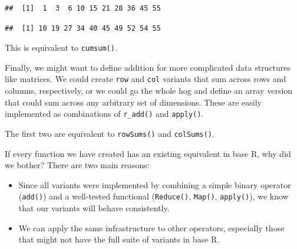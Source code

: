 \begin{verbatim}
##  [1]  1  3  6 10 15 21 28 36 45 55
\end{verbatim}

\begin{Shaded}
\begin{Highlighting}[]
\NormalTok{(}\OperatorTok{:}\NormalTok{)}
\end{Highlighting}
\end{Shaded}

\begin{verbatim}
##  [1] 10 19 27 34 40 45 49 52 54 55
\end{verbatim}

This is equivalent to \texttt{cumsum()}.

Finally, we might want to define addition for more complicated data
structures like matrices. We could create \texttt{row} and \texttt{col}
variants that sum across rows and columns, respectively, or we could go
the whole hog and define an array version that could sum across any
arbitrary set of dimensions. These are easily implemented as
combinations of \texttt{r\_add()} and \texttt{apply()}.

\begin{Shaded}
\begin{Highlighting}[]
\StringTok{ } \NormalTok{) \{}
\NormalTok{\}}
\StringTok{ } \NormalTok{) \{}
\NormalTok{\}}
\StringTok{ } \NormalTok{) \{}
\NormalTok{\}}
\end{Highlighting}
\end{Shaded}

The first two are equivalent to \texttt{rowSums()} and
\texttt{colSums()}.

If every function we have created has an existing equivalent in base R,
why did we bother? There are two main reasons:

\begin{itemize}
\item
  Since all variants were implemented by combining a simple binary
  operator (\texttt{add()}) and a well-tested functional
  (\texttt{Reduce()}, \texttt{Map()}, \texttt{apply()}), we know that
  our variants will behave consistently.
\item
  We can apply the same infrastructure to other operators, especially
  those that might not have the full suite of variants in base R.
\end{itemize}

